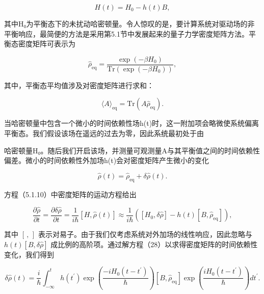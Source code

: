 \begin{equation}\tag{15.6.1}\label{eq:15.6.1}
H ( t ) = H _ { 0 } - h ( t ) B ,
\end{equation}

其中H₀为平衡态下的未扰动哈密顿量。令人惊叹的是，要计算系统对驱动场的非平衡响应，最简便的方法是采用第5.1节中发展起来的量子力学密度矩阵方法。平衡态密度矩阵可表示为

\begin{equation}\tag{15.6.2}\label{eq:15.6.2}
\hat { \rho } _ { \mathrm { e q } } = \frac { \exp ( - \beta H _ { 0 } ) } { \mathrm { T r } \left( \exp ( - \beta H _ { 0 } ) \right) } ,
\end{equation}

其中，平衡态平均值涉及对密度矩阵进行求和：

\begin{equation}\tag{15.6.3}\label{eq:15.6.3}
\langle A \rangle _ { \mathrm { e q } } = \mathrm { T r } \left( A \hat { \rho } _ { \mathrm { e q } } \right) .
\end{equation}

当哈密顿量中包含一个微小的时间依赖性场h(t)时，这一附加项会略微使系统偏离平衡态。我们假设该场在遥远的过去为零，因此系统最初处于由

哈密顿量H₀。随后我们开启该场，并测量可观测量A与其平衡值之间的时间依赖性偏差。微小的时间依赖性外加场h(t)会对密度矩阵产生微小的变化

\begin{equation}\tag{15.6.4}\label{eq:15.6.4}
\hat { \rho } ( t ) = \hat { \rho } _ { \mathrm { e q } } + \delta \hat { \rho } ( t ) .
\end{equation}

方程（5.1.10）中密度矩阵的运动方程给出

\begin{equation}\tag{15.6.5}\label{eq:15.6.5}
\frac { \partial \hat { \rho } } { \partial t } = \frac { \partial \delta \hat { \rho } } { \partial t } = \frac { 1 } { i \hbar } \left[ H , \hat { \rho } ( t ) \right] \approx \frac { 1 } { i \hbar } \left( \left[ H _ { 0 } , \delta \hat { \rho } \right] - h ( t ) \left[ B , \hat { \rho } _ { \mathrm { e q } } \right] \right) ,
\end{equation}

其中 \([\, , \,]\) 表示对易子。由于我们仅考虑系统对外加场的线性响应，因此忽略与 \(h(t)[B,\delta\hat{\rho}]\) 成比例的高阶项。通过解方程（28）以求得密度矩阵的时间依赖性变化，我们得到

\begin{equation}\tag{15.6.6}\label{eq:15.6.6}
\delta \hat { \rho } ( t ) = \frac { i } { \hbar } \int _ { - \infty } ^{t} h ( t ^{\prime} ) \exp \left( \frac { - i H _ { 0 } ( t - t ^{\prime} ) } { \hbar } \right) \left[ B , \hat { \rho } _ { \mathrm { e q } } \right] \exp \left( \frac { i H _ { 0 } ( t - t ^{\prime} ) } { \hbar } \right) d t ^{\prime} .
\end{equation}

